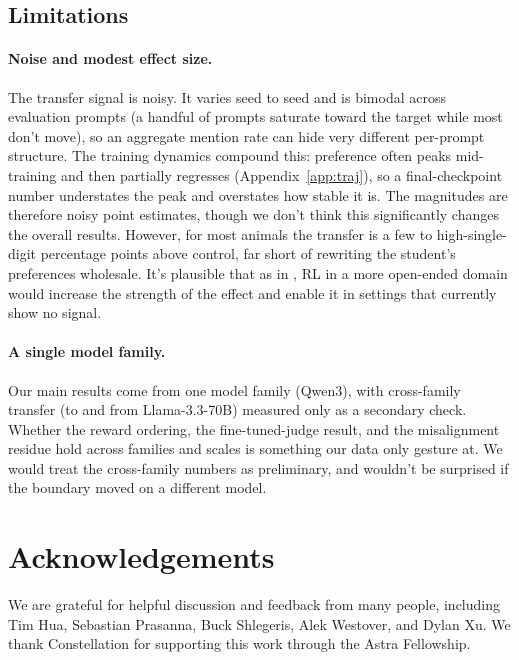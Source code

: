 \documentclass{article}
\begin{document}
\subsection{Limitations}
\paragraph{Noise and modest effect size.} The transfer signal is noisy. It varies seed to seed and is bimodal across evaluation prompts (a handful of prompts saturate toward the target while most don't move), so an aggregate mention rate can hide very different per-prompt structure. The training dynamics compound this: preference often peaks mid-training and then partially regresses (Appendix~\ref{app:traj}), so a final-checkpoint number understates the peak and overstates how stable it is. The magnitudes are therefore noisy point estimates, though we don't think this significantly changes the overall results. However, for most animals the transfer is a few to high-single-digit percentage points above control, far short of rewriting the student's preferences wholesale. It's plausible that as in \citet{draganov2026phantomtransferdatapoisoning}, RL in a more open-ended domain would increase the strength of the effect and enable it in settings that currently show no signal.

\paragraph{A single model family.} Our main results come from one model family (Qwen3), with cross-family transfer (to and from Llama-3.3-70B) measured only as a secondary check. Whether the reward ordering, the fine-tuned-judge result, and the misalignment residue hold across families and scales is something our data only gesture at. We would treat the cross-family numbers as preliminary, and wouldn't be surprised if the boundary moved on a different model.

\section*{Acknowledgements}
We are grateful for helpful discussion and feedback from many people, including Tim Hua, Sebastian Prasanna, Buck Shlegeris, Alek Westover, and Dylan Xu. We thank Constellation for supporting this work through the Astra Fellowship.
\end{document}

